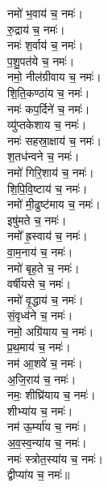 \begin{multicols}{2}
\begin{flushleft}
नमो॑ भ॒वाय॑ च॒ नमः॑।\\
रु॒द्राय॑ च॒ नमः॑।\\
नमः॑ श॒र्वाय॑ च॒ नमः॑।\\
प॒शु॒पत॑ये च॒ नमः॑।\\
नमो॒ नील॑ग्रीवाय च॒ नमः॑।\\
शि॒ति॒कण्ठा॑य च॒ नमः॑।\\
नमः॑ कप॒र्दिने॑ च॒ नमः॑।\\
व्यु॑प्तकेशाय च॒ नमः॑।\\
नमः॑ सहस्रा॒क्षाय॑ च॒ नमः॑।\\
श॒तध॑न्वने च॒ नमः॑।\hfill {}\\
नमो॑ गिरि॒शाय॑ च॒ नमः॑।\\
शि॒पि॒वि॒ष्टाय॑ च॒ नमः॑।\\
नमो॑ मी॒ढुष्ट॑माय च॒ नमः॑।\\
इषु॑मते च॒ नमः॑।\\
नमो᳚ ह्र॒स्वाय॑ च॒ नमः॑।\\
वा॒म॒नाय॑ च॒ नमः॑।\\
नमो॑ बृह॒ते च॒ नमः॑।\\
वर्षी॑यसे च॒ नमः॑।\\
नमो॑ वृ॒द्धाय॑ च॒ नमः॑।\\
सं॒वृध्व॑ने च॒ नमः॑।\hfill {}\\
नमो॒ अग्रि॑याय च॒ नमः॑।\\
प्र॒थ॒माय॑ च॒ नमः॑।\\
नम॑ आ॒शवे॑ च॒ नमः॑।\\
अ॒जि॒राय॑ च॒ नमः॑।\\
नमः॒ शीघ्रि॑याय च॒ नमः॑।\\
शीभ्या॑य च॒ नमः॑।\\
नम॑ ऊ॒र्म्या॑य च॒ नमः॑।\\
अ॒व॒स्व॒न्या॑य च॒ नमः॑।\\
नमः॑ स्त्रोत॒स्या॑य च॒ नमः॑।\\
द्वीप्या॑य च॒ नमः॑॥\hfill {}\\


\end{flushleft}
\end{multicols}
